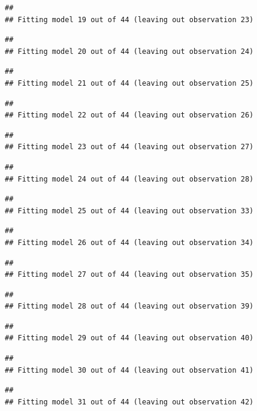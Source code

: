 \documentclass[]{article}
\begin{document}
\begin{verbatim}
## 
## Fitting model 19 out of 44 (leaving out observation 23)
\end{verbatim}

\begin{verbatim}
## 
## Fitting model 20 out of 44 (leaving out observation 24)
\end{verbatim}

\begin{verbatim}
## 
## Fitting model 21 out of 44 (leaving out observation 25)
\end{verbatim}

\begin{verbatim}
## 
## Fitting model 22 out of 44 (leaving out observation 26)
\end{verbatim}

\begin{verbatim}
## 
## Fitting model 23 out of 44 (leaving out observation 27)
\end{verbatim}

\begin{verbatim}
## 
## Fitting model 24 out of 44 (leaving out observation 28)
\end{verbatim}

\begin{verbatim}
## 
## Fitting model 25 out of 44 (leaving out observation 33)
\end{verbatim}

\begin{verbatim}
## 
## Fitting model 26 out of 44 (leaving out observation 34)
\end{verbatim}

\begin{verbatim}
## 
## Fitting model 27 out of 44 (leaving out observation 35)
\end{verbatim}

\begin{verbatim}
## 
## Fitting model 28 out of 44 (leaving out observation 39)
\end{verbatim}

\begin{verbatim}
## 
## Fitting model 29 out of 44 (leaving out observation 40)
\end{verbatim}

\begin{verbatim}
## 
## Fitting model 30 out of 44 (leaving out observation 41)
\end{verbatim}

\begin{verbatim}
## 
## Fitting model 31 out of 44 (leaving out observation 42)
\end{verbatim}
\end{document}
